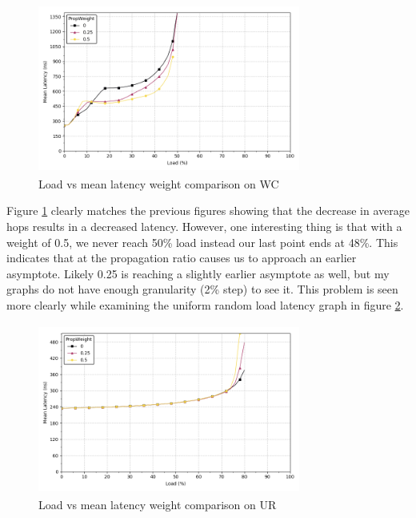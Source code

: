 \documentclass[conference,12pt]{IEEEtran}
\begin{document}

\begin{figure}[ht]
  \begin{center}
    \includegraphics[width=3.4in,height=2.2in]{figures/loadlatcomp_GA_Mean.png}
  \end{center}
   \vspace{-0.25in}
 \caption[load latency compare GA mean]{Load vs mean latency weight comparison on WC}
 \label{fig:loadlatcompGA}
\end{figure}

Figure \ref{fig:loadlatcompGA} clearly matches the previous figures showing that the decrease in average hops results in a decreased latency. However, one interesting thing is that with a weight of 0.5, we never reach 50\% load instead our last point ends at 48\%. This indicates that at the propagation ratio causes us to approach an earlier asymptote. Likely 0.25 is reaching a slightly earlier asymptote as well, but my graphs do not have enough granularity (2\% step) to see it. This problem is seen more clearly while examining the uniform random load latency graph in figure \ref{fig:loadlatcompURmean}.


\begin{figure}[ht]
  \begin{center}
    \includegraphics[width=3.4in,height=2.2in]{figures/loadlatcomp_UR_Mean.png}
  \end{center}
   \vspace{-0.25in}
 \caption[load latency compare UR mean]{Load vs mean latency weight comparison on UR}
 \label{fig:loadlatcompURmean}
\end{figure}
\end{document}
